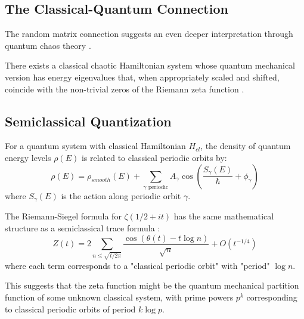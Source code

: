 \subsection{The Classical-Quantum Connection}

The random matrix connection suggests an even deeper interpretation through quantum chaos theory \cite{berrykeating1999}.

\begin{conjecture}
\label{conj:berry_keating}
There exists a classical chaotic Hamiltonian system whose quantum mechanical version has energy eigenvalues that, when appropriately scaled and shifted, coincide with the non-trivial zeros of the Riemann zeta function \cite{berrykeating1999}.
\end{conjecture}

\subsection{Semiclassical Quantization}

\begin{definition}
For a quantum system with classical Hamiltonian $H_{cl}$, the density of quantum energy levels $\rho(E)$ is related to classical periodic orbits by:
\begin{equation}
\rho(E) = \rho_{smooth}(E) + \sum_{\gamma \text{ periodic}} A_\gamma \cos\left(\frac{S_\gamma(E)}{\hbar} + \phi_\gamma\right)
\end{equation}
where $S_\gamma(E)$ is the action along periodic orbit $\gamma$.
\end{definition}

\begin{theorem}
\label{thm:semiclassical_interpretation}
The Riemann-Siegel formula for $\zeta(1/2 + it)$ has the same mathematical structure as a semiclassical trace formula \cite{berrykeating1999}:
\begin{equation}
Z(t) = 2 \sum_{n \leq \sqrt{t/2\pi}} \frac{\cos(\theta(t) - t\log n)}{\sqrt{n}} + O(t^{-1/4})
\end{equation}
where each term corresponds to a "classical periodic orbit" with "period" $\log n$.
\end{theorem}

\begin{remark}
This suggests that the zeta function might be the quantum mechanical partition function of some unknown classical system, with prime powers $p^k$ corresponding to classical periodic orbits of period $k \log p$.
\end{remark}

